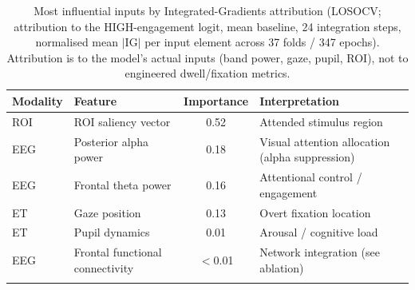 \begin{table}[t]
  \caption{Most influential inputs by Integrated-Gradients attribution (LOSOCV; attribution to the HIGH-engagement logit, mean baseline, 24 integration steps, normalised mean $|\mathrm{IG}|$ per input element across 37 folds / 347 epochs). Attribution is to the model's actual inputs (band power, gaze, pupil, ROI), not to engineered dwell/fixation metrics.}
  \label{tab:features}
  \centering
  \begin{tabular}{@{}llcl@{}}
    \toprule
    Modality & Feature & Importance & Interpretation \\
    \midrule
    ROI & ROI saliency vector            & 0.52 & Attended stimulus region \\
    EEG & Posterior alpha power          & 0.18 & Visual attention allocation (alpha suppression) \\
    EEG & Frontal theta power            & 0.16 & Attentional control / engagement \\
    ET  & Gaze position                  & 0.13 & Overt fixation location \\
    ET  & Pupil dynamics                 & 0.01 & Arousal / cognitive load \\
    EEG & Frontal functional connectivity & $<$0.01 & Network integration (see ablation) \\
    \botrule
  \end{tabular}
\end{table}
